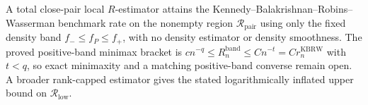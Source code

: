 A total close-pair local \(R\)-estimator attains the Kennedy--Balakrishnan--Robins--Wasserman benchmark rate on the nonempty region \(\mathcal R_{\mathrm{pair}}\) using only the fixed density band \(f_{-}\leq f_P\leq f_{+}\), with no density estimator or density smoothness.  The proved positive-band minimax bracket is \(c n^{-q}\leq R_n^{\mathrm{band}}\leq Cn^{-t}=Cr_n^{\mathrm{KBRW}}\) with \(t<q\), so exact minimaxity and a matching positive-band converse remain open.  A broader rank-capped estimator gives the stated logarithmically inflated upper bound on \(\mathcal R_{\mathrm{low}}\).